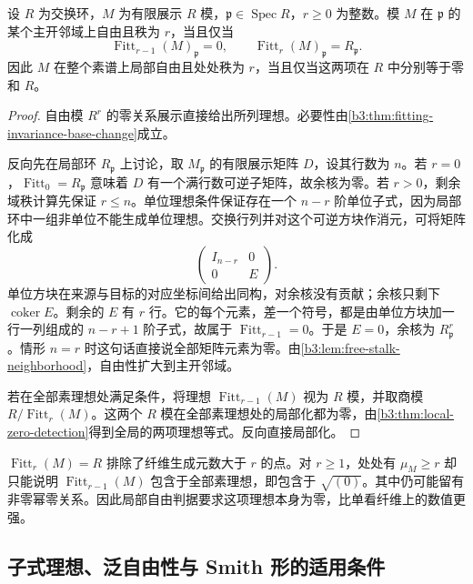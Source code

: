 \begin{theorem}\label{b3:thm:fitting-local-free}
	设 \(R\) 为交换环，\(M\) 为有限展示 \(R\) 模，\(\mathfrak p\in\operatorname{Spec}R\)，\(r\ge0\) 为整数。模 \(M\) 在 \(\mathfrak p\) 的某个主开邻域上自由且秩为 \(r\)，当且仅当
	\[
		\operatorname{Fitt}_{r-1}(M)_{\mathfrak p}=0, \qquad \operatorname{Fitt}_{r}(M)_{\mathfrak p}=R_{\mathfrak p}.
	\]
	因此 \(M\) 在整个素谱上局部自由且处处秩为 \(r\)，当且仅当这两项在 \(R\) 中分别等于零和 \(R\)。
\end{theorem}
\begin{proof}
	自由模 \(R^r\) 的零关系展示直接给出所列理想。必要性由\cref{b3:thm:fitting-invariance-base-change}成立。

	反向先在局部环 \(R_{\mathfrak p}\) 上讨论，取 \(M_{\mathfrak p}\) 的有限展示矩阵 \(D\)，设其行数为 \(n\)。若 \(r=0\)，\(\operatorname{Fitt}_0=R_{\mathfrak p}\) 意味着 \(D\) 有一个满行数可逆子矩阵，故余核为零。若 \(r>0\)，剩余域秩计算先保证 \(r\le n\)。单位理想条件保证存在一个 \(n-r\) 阶单位子式，因为局部环中一组非单位不能生成单位理想。交换行列并对这个可逆方块作消元，可将矩阵化成
	\[
		\begin{pmatrix}I_{n-r}&0\\0&E\end{pmatrix}.
	\]
	单位方块在来源与目标的对应坐标间给出同构，对余核没有贡献；余核只剩下 \(\operatorname{coker}E\)。剩余的 \(E\) 有 \(r\) 行。它的每个元素，差一个符号，都是由单位方块加一行一列组成的 \(n-r+1\) 阶子式，故属于 \(\operatorname{Fitt}_{r-1}=0\)。于是 \(E=0\)，余核为 \(R_{\mathfrak p}^r\)。情形 \(n=r\) 时这句话直接说全部矩阵元素为零。由\cref{b3:lem:free-stalk-neighborhood}，自由性扩大到主开邻域。

	若在全部素理想处满足条件，将理想 \(\operatorname{Fitt}_{r-1}(M)\) 视为 \(R\) 模，并取商模 \(R/\operatorname{Fitt}_r(M)\)。这两个 \(R\) 模在全部素理想处的局部化都为零，由\cref{b3:thm:local-zero-detection}得到全局的两项理想等式。反向直接局部化。
\end{proof}

\(\operatorname{Fitt}_r(M)=R\) 排除了纤维生成元数大于 \(r\) 的点。对 \(r\ge1\)，处处有 \(\mu_M\ge r\) 却只能说明 \(\operatorname{Fitt}_{r-1}(M)\) 包含于全部素理想，即包含于 \(\sqrt{(0)}\)。其中仍可能留有非零幂零关系。因此局部自由判据要求这项理想本身为零，比单看纤维上的数值更强。

\subsection{子式理想、泛自由性与 Smith 形的适用条件}
\label{b3:subsec:1203:04}

